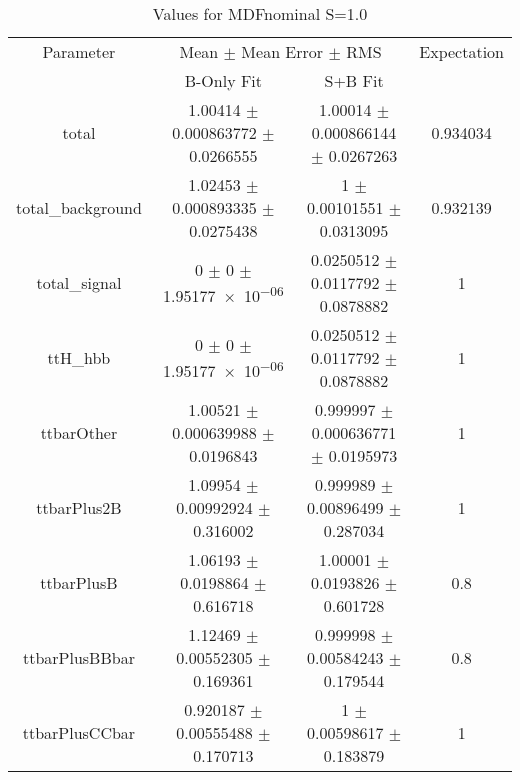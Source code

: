 \begin{table}
\centering
\caption{Values for MDFnominal S=1.0}
\begin{tabular}{cccc}
\toprule
Parameter & \multicolumn{2}{c}{Mean $\pm$ Mean Error $\pm$ RMS} & Expectation\\
 & B-Only Fit & S+B Fit & \\
\midrule
total & \num{1.00414} $\pm$ \num{0.000863772} $\pm$ \num{0.0266555} & \num{1.00014} $\pm$ \num{0.000866144} $\pm$ \num{0.0267263} & \num{0.934034}\\
total\_background & \num{1.02453} $\pm$ \num{0.000893335} $\pm$ \num{0.0275438} & \num{1} $\pm$ \num{0.00101551} $\pm$ \num{0.0313095} & \num{0.932139}\\
total\_signal & \num{0} $\pm$ \num{0} $\pm$ \num{1.95177e-06} & \num{0.0250512} $\pm$ \num{0.0117792} $\pm$ \num{0.0878882} & \num{1}\\
ttH\_hbb & \num{0} $\pm$ \num{0} $\pm$ \num{1.95177e-06} & \num{0.0250512} $\pm$ \num{0.0117792} $\pm$ \num{0.0878882} & \num{1}\\
ttbarOther & \num{1.00521} $\pm$ \num{0.000639988} $\pm$ \num{0.0196843} & \num{0.999997} $\pm$ \num{0.000636771} $\pm$ \num{0.0195973} & \num{1}\\
ttbarPlus2B & \num{1.09954} $\pm$ \num{0.00992924} $\pm$ \num{0.316002} & \num{0.999989} $\pm$ \num{0.00896499} $\pm$ \num{0.287034} & \num{1}\\
ttbarPlusB & \num{1.06193} $\pm$ \num{0.0198864} $\pm$ \num{0.616718} & \num{1.00001} $\pm$ \num{0.0193826} $\pm$ \num{0.601728} & \num{0.8}\\
ttbarPlusBBbar & \num{1.12469} $\pm$ \num{0.00552305} $\pm$ \num{0.169361} & \num{0.999998} $\pm$ \num{0.00584243} $\pm$ \num{0.179544} & \num{0.8}\\
ttbarPlusCCbar & \num{0.920187} $\pm$ \num{0.00555488} $\pm$ \num{0.170713} & \num{1} $\pm$ \num{0.00598617} $\pm$ \num{0.183879} & \num{1}\\
\bottomrule
\end{tabular}
\end{table}